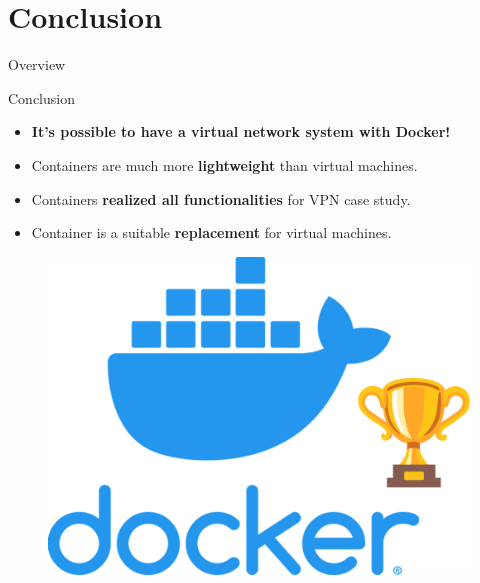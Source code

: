 \documentclass{beamer}
\begin{document}
\section{Conclusion}
\begin{frame}{Overview}
    \tableofcontents[currentsection]
\end{frame}
\begin{frame}{Conclusion}
\begin{itemize}
\item \textbf{It's possible to have a virtual network system with Docker!}
\item Containers are much more \textbf{lightweight} than virtual machines.
\item Containers \textbf{realized all functionalities} for VPN case study.
\item Container is a suitable \textbf{replacement} for virtual machines.
\end{itemize}
\begin{figure}[t!]
  \begin{center}
    \includegraphics[scale=0.25]{slide/img/docker-win.png}
    \label{fig:docker-win}
  \end{center}
\end{figure}
\end{frame}
\end{document}
